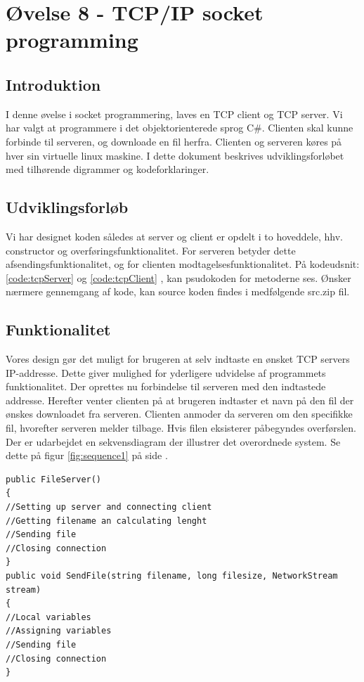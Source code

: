 \section{Øvelse 8 - TCP/IP socket programming}

\subsection{Introduktion}
I denne øvelse i socket programmering, laves en TCP client og TCP server. Vi har valgt at programmere i det objektorienterede sprog C\#. Clienten skal kunne forbinde til serveren, og downloade en fil herfra. Clienten og serveren køres på hver sin virtuelle linux maskine. I dette dokument beskrives udviklingsforløbet med tilhørende digrammer og kodeforklaringer.

\subsection{Udviklingsforløb}
Vi har designet koden således at server og client er opdelt i to hoveddele, hhv. constructor og overføringsfunktionalitet. For serveren betyder dette afsendingsfunktionalitet, og for clienten modtagelsesfunktionalitet. På kodeudsnit: \ref{code:tcpServer}  og \ref{code:tcpClient} , kan psudokoden for metoderne ses. Ønsker nærmere gennemgang af kode, kan source koden findes i medfølgende src.zip fil.

\subsection{Funktionalitet}
Vores design gør det muligt for brugeren at selv indtaste en ønsket TCP servers IP-addresse. Dette giver mulighed for yderligere udvidelse af programmets funktionalitet. Der oprettes nu forbindelse til serveren med den indtastede addresse. Herefter venter clienten på at brugeren indtaster et navn på den fil der ønskes downloadet fra serveren. Clienten  anmoder da serveren om den specifikke fil, hvorefter serveren melder tilbage. Hvis filen eksisterer påbegyndes overførslen. Der er udarbejdet en sekvensdiagram der illustrer det overordnede system. Se dette på figur \ref{fig:sequence1} på side \pageref{fig:sequence1}.

\begin{lstlisting}[caption = Hoveddesign for server,label=code:tcpServer]
public FileServer()
{
//Setting up server and connecting client
//Getting filename an calculating lenght
//Sending file 
//Closing connection
}
public void SendFile(string filename, long filesize, NetworkStream stream)
{
//Local variables
//Assigning variables
//Sending file
//Closing connection
}
\end{lstlisting}

